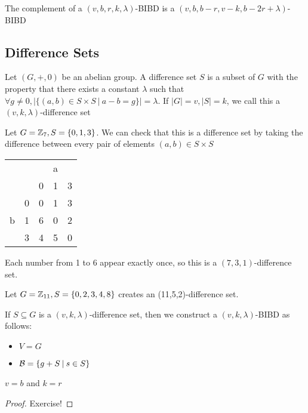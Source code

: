 \begin{exercise}
    The complement of a $(v, b, r, k, \lambda)$-BIBD is a $(v, b, b-r, v-k, b-2r+\lambda)$-BIBD
\end{exercise}

\subsection{Difference Sets}
Let $(G, +, 0)$ be an abelian group.
A difference set $S$ is a subset of $G$ with the property that there exists a constant $\lambda$ such that $\forall g \neq 0, \left\lvert\{(a,b) \in S \times S \:|\: a - b = g \}\right\rvert = \lambda$.
If $|G| = v, |S| = k$, we call this a $(v,k,\lambda)$-difference set

\begin{example}
    Let $G = \mathbb{Z}_7, S = \{0,1,3\}$.
    We can check that this is a difference set by taking the difference between every pair of elements $(a, b) \in S \times S$
    
    \begin{center}        
        \begin{tabular}{rc|c|c|c}
            \multicolumn{2}{c}{} & \multicolumn{3}{c}{a} \\
            & & 0 & 1 & 3 \\
            \cline{2-5}
            \multirow{3}{*}{b} & 0 & 0 & 1 & 3 \\
            \cline{2-5}
            & 1 & 6 & 0 & 2 \\
            \cline{2-5}
            & 3 & 4 & 5 & 0 \\
        \end{tabular}
    \end{center}

    Each number from 1 to 6 appear exactly once, so this is a $(7,3,1)$-difference set.
\end{example}

\begin{example}
    Let $G = \mathbb{Z}_{11}, S = \{0,2,3,4,8\}$ creates an (11,5,2)-difference set.
\end{example}

\begin{theorem}
    If $S \subseteq G$ is a $(v, k, \lambda)$-difference set, then we construct a $(v, k, \lambda)$-BIBD as follows:
    \begin{itemize}
        \item $V = G$
        \item $\mathcal{B} = \{g + S \:|\: s \in S \}$
    \end{itemize}
\end{theorem}
\begin{note}
    $v = b$ and $k = r$
\end{note}
\begin{proof}
    Exercise!
\end{proof}

